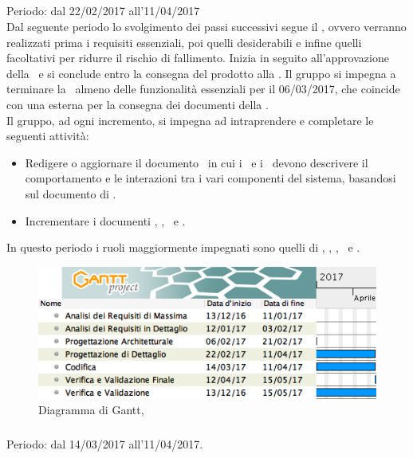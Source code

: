 \subsection{\PD}
Periodo: dal 22/02/2017 all'11/04/2017\\

Dal seguente periodo lo svolgimento dei passi successivi segue il , ovvero verranno realizzati prima i requisiti essenziali, poi quelli desiderabili e infine quelli facoltativi per ridurre il rischio di fallimento. 
Inizia in seguito all'approvazione della \PA\ e si conclude entro la consegna del prodotto alla \RQ.
Il gruppo si impegna a terminare la \PD\ almeno delle funzionalità essenziali per il 06/03/2017, che coincide con una  esterna per la consegna dei documenti della \RP.\\
Il gruppo, ad ogni incremento, si impegna ad intraprendere e completare le seguenti attività:
\begin{itemize}
\item
Redigere o aggiornare il documento \DDP\ in cui i \ProgrP\ e i \ProgP\ devono descrivere il comportamento e le interazioni tra i vari componenti del sistema, basandosi sul documento di \ST.
\item
Incrementare i documenti \NdP, \PdP, \PdQ\ e \Gl.
\end{itemize}
In questo periodo i ruoli maggiormente impegnati sono quelli di \Prog, \Progr, \Pm, \Ver\ e \Am.

 \begin{figure}[H]
	\centering 
	\includegraphics[scale=0.5]{Immagini/Gantt/PD.png}
	\caption{Diagramma di Gantt, \PD}
\end{figure}

\subsubsection{\COD}
Periodo: dal 14/03/2017 all'11/04/2017. \\

